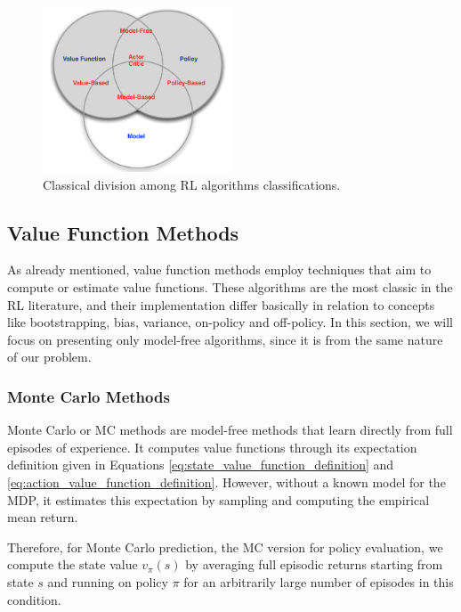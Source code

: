 

\begin{figure}[H]
    \centering
    \includegraphics[width=0.5\textwidth]{Chapter2/categorizing_RL.png} 
    \caption{Classical division among RL algorithms classifications.}
    \label{fig:categorizing_RL}
\end{figure}

\subsection{Value Function Methods}

As already mentioned, value function methods employ techniques that aim to compute or estimate value functions. These algorithms are the most classic in the RL literature, and their implementation differ basically in relation to concepts like bootstrapping, bias, variance, on-policy and off-policy. In this section, we will focus on presenting only model-free algorithms, since it is from the same nature of our problem.

\subsubsection{Monte Carlo Methods}

Monte Carlo or MC methods \cite{Sutton1998} are model-free methods that learn directly from full episodes of experience. It computes value functions through its expectation definition given in Equations \eqref{eq:state_value_function_definition} and \eqref{eq:action_value_function_definition}. However, without a known model for the MDP, it estimates this expectation by sampling and computing the empirical mean return.

Therefore, for Monte Carlo prediction, the MC version for policy evaluation, we compute the state value $v_{\pi}(s)$ by averaging full episodic returns starting from state $s$ and running on policy $\pi$ for an arbitrarily large number of episodes in this condition.

